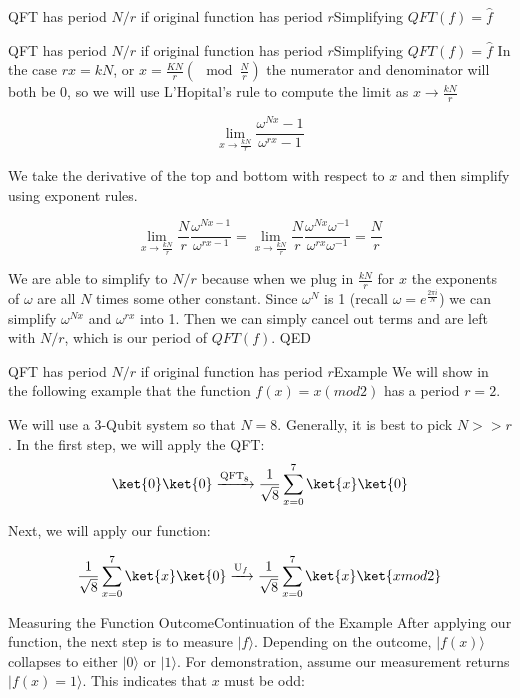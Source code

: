 {\begin{frame}{QFT has period $N/r$ if original function has period $r$}{Simplifying $QFT(f) = \hat{f}$}
\end{frame}

\begin{frame}{QFT has period $N/r$ if original function has period $r$}{Simplifying $QFT(f) = \hat{f}$}
In the case $rx = kN$, or $x = \frac{KN}{r} (\mod{\frac{N}{r}})$ the numerator and denominator will both be 0, so we will use L'Hopital's rule to compute the limit as $x \to \frac{kN}{r}$

\[
   \lim_{x \to \frac{kN}{r}} \frac{\omega^{Nx}-1}{\omega^{rx}-1}
\]

We take the derivative of the top and bottom with respect to $x$ and then simplify using exponent rules.

\[
   \lim_{x \to \frac{kN}{r}} \frac{N}{r} \frac{\omega^{Nx-1}}{\omega^{rx-1}} =  \lim_{x \to \frac{kN}{r}} \frac{N}{r} \frac{\omega^{Nx}\omega^{-1}}{\omega^{rx}\omega^{-1}} = \frac{N}{r}
\]

We are able to simplify to $N/r$ because when we plug in $\frac{kN}{r}$ for $x$ the exponents of $\omega$ are all $N$ times some other constant. Since $\omega^N$ is 1 (recall $\omega = e^{\frac{2\pi i}{N}}$) we can simplify $\omega^{Nx}$ and $\omega^{rx}$ into 1. Then we can simply cancel out terms and are left with $N/r$, which is our period of $QFT(f)$. QED

\end{frame}

\begin{frame}{QFT has period $N/r$ if original function has period $r$}{Example}
We will show in the following example that the function $f(x) = x (mod 2)$ has a period $r = 2$.

We will use a 3-Qubit system so that $N=8$. Generally, it is best to pick $N>>r$. In the first step, we will apply the QFT: 
\[
   \ket{0}\ket{0}\xrightarrow{\text{QFT}_8} \frac{1}{\sqrt{8}}\sum_{x=0}^{7} \ket{x}\ket{0}
\]

Next, we will apply our function:

\[
  \frac{1}{\sqrt{8}}\sum_{x=0}^{7} \ket{x}\ket{0} \xrightarrow{\text{U}_f} \frac{1}{\sqrt{8}}\sum_{x=0}^{7} \ket{x}\ket{x  mod 2}
\]


\end{frame}

\begin{frame}{Measuring the Function Outcome}{Continuation of the Example}
After applying our function, the next step is to measure \( |f\rangle \). Depending on the outcome, \( |f(x)\rangle \) collapses to either \( |0\rangle \) or \( |1\rangle \). For demonstration, assume our measurement returns \( |f(x) = 1\rangle \). This indicates that \( x \) must be odd:


\end{frame}}
